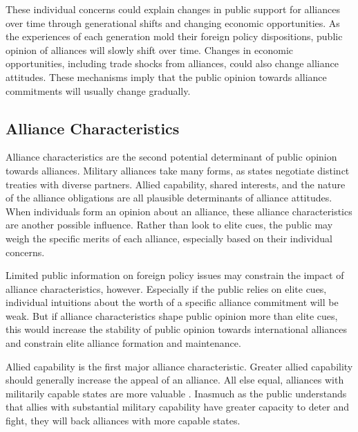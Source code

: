 \documentclass[12pt]{article}
\begin{document}
These individual concerns could explain changes in public support for alliances over time through generational shifts and changing economic opportunities. 
As the experiences of each generation mold their foreign policy dispositions, public opinion of alliances will slowly shift over time. 
Changes in economic opportunities, including trade shocks from alliances, could also change alliance attitudes. 
These mechanisms imply that the public opinion towards alliance commitments will usually change gradually. 



\subsection{Alliance Characteristics}

Alliance characteristics are the second potential determinant of public opinion towards alliances.
Military alliances take many forms, as states negotiate distinct treaties with diverse partners.
Allied capability, shared interests, and the nature of the alliance obligations are all plausible determinants of alliance attitudes.   
When individuals form an opinion about an alliance, these alliance characteristics are another possible influence. 
Rather than look to elite cues, the public may weigh the specific merits of each alliance, especially based on their individual concerns. 


Limited public information on foreign policy issues may constrain the impact of alliance characteristics, however. 
Especially if the public relies on elite cues, individual intuitions about the worth of a specific alliance commitment will be weak. 
But if alliance characteristics shape public opinion more than elite cues, this would increase the stability of public opinion towards international alliances and constrain elite alliance formation and maintenance. 


Allied capability is the first major alliance characteristic.
Greater allied capability should generally increase the appeal of an alliance. 
All else equal, alliances with militarily capable states are more valuable \citep{Johnsonetal2015}. 
Inasmuch as the public understands that allies with substantial military capability have greater capacity to deter and fight, they will back alliances with more capable states. 
\end{document}
